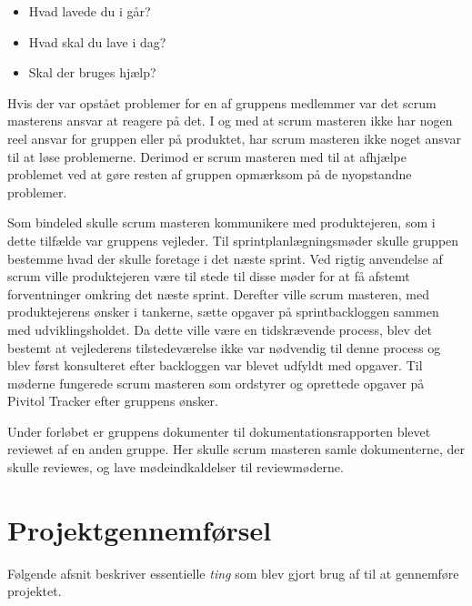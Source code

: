 \begin{itemize}
	\item Hvad lavede du i går?
	\item Hvad skal du lave i dag?
	\item Skal der bruges hjælp?
\end{itemize} 

Hvis der var opstået problemer for en af gruppens medlemmer var det scrum masterens ansvar at reagere på det. I og med at scrum masteren ikke har nogen reel ansvar for gruppen eller på produktet, har scrum masteren ikke noget ansvar til at løse problemerne. Derimod er scrum masteren med til at afhjælpe problemet ved at gøre resten af gruppen opmærksom på de nyopstandne problemer. 

Som bindeled skulle scrum masteren kommunikere med produktejeren, som i dette tilfælde var gruppens vejleder. Til sprintplanlægningsmøder skulle gruppen bestemme hvad der skulle foretage i det næste sprint. Ved rigtig anvendelse af scrum ville produktejeren være til stede til disse møder for at få afstemt forventninger omkring det næste sprint. Derefter ville scrum masteren, med produktejerens ønsker i tankerne, sætte opgaver på sprintbackloggen sammen med udviklingsholdet. Da dette ville være en tidskrævende process, blev det bestemt at vejlederens tilstedeværelse ikke var nødvendig til denne process og blev først konsulteret efter backloggen var blevet udfyldt med opgaver. Til møderne fungerede scrum masteren som ordstyrer og oprettede opgaver på Pivitol Tracker efter gruppens ønsker. \par 
Under forløbet er gruppens dokumenter til dokumentationsrapporten blevet reviewet af en anden gruppe. Her skulle scrum masteren samle dokumenterne, der skulle reviewes, og lave mødeindkaldelser til reviewmøderne.







\chapter{Projektgennemførsel}

Følgende afsnit beskriver essentielle \textit{ting} som blev gjort brug af til at gennemføre projektet. 



